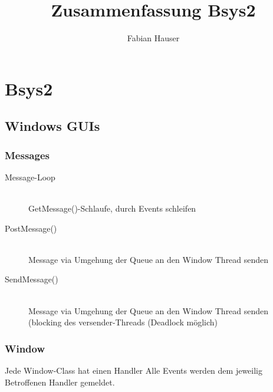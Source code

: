 

\title{Zusammenfassung Bsys2}
\author{Fabian Hauser}
 

\maketitle
\section{Bsys2}

\subsection{Windows GUIs}



\subsubsection{Messages}

\begin{description}
	\item[Message-Loop] \hfill \\
		GetMessage()-Schlaufe, durch Events schleifen
	\item[PostMessage()] \hfill \\
		Message via Umgehung der Queue an den Window Thread senden
	\item[SendMessage()] \hfill \\
		Message via Umgehung der Queue an den Window Thread senden (blocking des versender-Threads (Deadlock möglich)
\end{description}

\subsubsection{Window}

Jede Window-Class hat einen Handler
Alle Events werden dem jeweilig Betroffenen Handler gemeldet.



